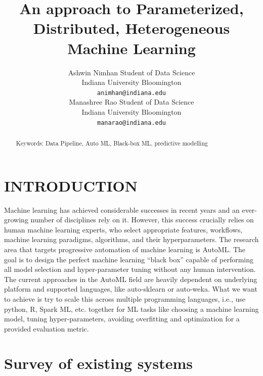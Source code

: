 \documentclass[10pt,onecolumn]{IEEEtran}
\title{\LARGE \bf
An approach to Parameterized, Distributed, Heterogeneous Machine Learning
}
\author{ 
		 \parbox{3 in}
		 {\centering Ashwin Nimhan
         Student of Data Science\\
         Indiana University Bloomington\\
         {\tt\small animhan@indiana.edu}}
         \hspace*{ 0.5 in}
         \parbox{3 in}{\centering Manashree Rao
         Student of Data Science\\
         Indiana University Bloomington\\
         {\tt\small manarao@indiana.edu}}
         \hspace*{ 0.5 in}
}
\begin{document}
\maketitle
\begin{abstract}

Keywords: Data Pipeline, Auto ML, Black-box ML, predictive modelling
\end{abstract}


\section{INTRODUCTION}
Machine learning has achieved considerable successes in recent years and an ever-growing number of disciplines rely on it. However, this success crucially relies on human machine learning experts, who select appropriate features, workflows, machine learning paradigms, algorithms, and their hyperparameters.  
The research area that targets progressive automation of machine learning is AutoML. The goal is to design the perfect machine learning “black box” capable of performing all model selection and hyper-parameter tuning without any human intervention. 
The current approaches in the AutoML field are heavily dependent on underlying platform and supported languages, like auto-sklearn or auto-weka. What we want to achieve is try to scale this across multiple programming languages, i.e., use python, R, Spark ML, etc. together for ML tasks like choosing a machine learning model, tuning hyper-parameters, avoiding overfitting and optimization for a provided evaluation metric.


\section{Survey of existing systems}
\end{document}
